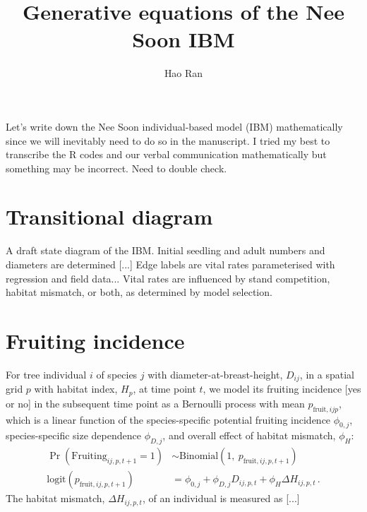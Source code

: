 \documentclass[12pt,a4paper]{article}
\author{Hao Ran}
\title{Generative equations of the Nee Soon IBM}
\begin{document}
\maketitle

Let's write down the Nee Soon individual-based model (IBM) mathematically since we will inevitably need to do so in the manuscript. I tried my best to transcribe the R codes and our verbal communication mathematically but something may be incorrect. Need to double check.

\section{Transitional diagram}

A draft state diagram of the IBM. Initial seedling and adult numbers and diameters are determined [...] Edge labels are vital rates parameterised with regression and field data... Vital rates are influenced by stand competition, habitat mismatch, or both, as determined by model selection.

\begin{center}
\end{center}

\section{Fruiting incidence}
For tree individual $i$ of species $j$ with diameter-at-breast-height, $D_{ij}$, in a spatial grid $p$ with habitat index, $H_p$, at time point $t$, we model its fruiting incidence [yes or no] in the subsequent time point as a Bernoulli process with mean $p_{\text{fruit},ijp}$, which is a linear function of the species-specific potential fruiting incidence $\phi_{0,j}$, species-specific size dependence $\phi_{D,j}$, and overall effect of habitat mismatch, $\phi_H$:
\begin{align}
\Pr\left(\text{Fruiting}_{ij,p,t+1}=1\right) &\sim \text{Binomial}\left(1,~p_{\text{fruit},ij,p,t+1}\right) \\
\text{logit}\left(p_{\text{fruit},ij,p,t+1}\right) &= \phi_{0,j} + \phi_{D,j} D_{ij,p,t} + \phi_H \Delta H_{ij,p,t} \,.
\end{align}
The habitat mismatch, $\Delta H_{ij,p,t}$, of an individual is measured as [...]
\end{document}
